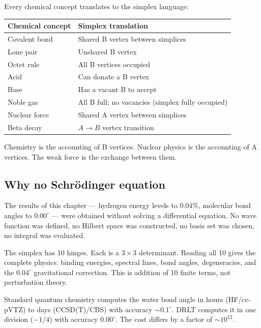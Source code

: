 \documentclass[12pt]{article}
\theoremstyle{remark}
\theoremstyle{definition}
\begin{document}
Every chemical concept translates to the simplex language:

\begin{center}
\begin{tabular}{ll}
\hline
Chemical concept & Simplex translation \\
\hline
Covalent bond & Shared B vertex between simplices \\
Lone pair & Unshared B vertex \\
Octet rule & All B vertices occupied \\
Acid & Can donate a B vertex \\
Base & Has a vacant B to accept \\
Noble gas & All B full; no vacancies (simplex fully occupied) \\
Nuclear force & Shared A vertex between simplices \\
Beta decay & $A \to B$ vertex transition \\
\hline
\end{tabular}
\end{center}

Chemistry is the accounting of B vertices. Nuclear physics is the accounting of A vertices. The weak force is the exchange between them.

\subsection{Why no Schr\"odinger equation}

The results of this chapter --- hydrogen energy levels to $0.04\%$, molecular bond angles to $0.00^\circ$ --- were obtained without solving a differential equation. No wave function was defined, no Hilbert space was constructed, no basis set was chosen, no integral was evaluated.

The simplex has 10 hinges. Each is a $3 \times 3$ determinant. Reading all 10 gives the complete physics: binding energies, spectral lines, bond angles, degeneracies, and the $0.04^\circ$ gravitational correction. This is addition of 10 finite terms, not perturbation theory.

Standard quantum chemistry computes the water bond angle in hours (HF/cc-pVTZ) to days (CCSD(T)/CBS) with accuracy $\sim 0.1^\circ$. DRLT computes it in one division ($-1/4$) with accuracy $0.00^\circ$. The cost differs by a factor of $\sim 10^{12}$.


\end{document}
